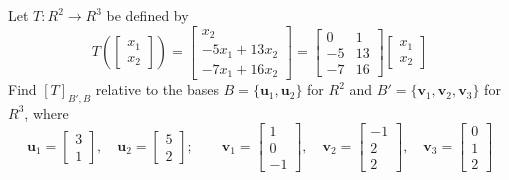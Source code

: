 \documentclass{article}
\begin{document}
Let $T : R^2 \to R^3$ be defined by
\[
  T\!\left(\begin{bmatrix}x_1\\x_2\end{bmatrix}\right)
  = \begin{bmatrix}x_2\\-5x_1+13x_2\\-7x_1+16x_2\end{bmatrix}
  = \begin{bmatrix}0&1\\-5&13\\-7&16\end{bmatrix}\begin{bmatrix}x_1\\x_2\end{bmatrix}
\]
Find $[T]_{B',B}$ relative to the bases $B = \{\mathbf{u}_1, \mathbf{u}_2\}$ for $R^2$
and $B' = \{\mathbf{v}_1, \mathbf{v}_2, \mathbf{v}_3\}$ for $R^3$, where
\[
  \mathbf{u}_1 = \begin{bmatrix}3\\1\end{bmatrix},\quad
  \mathbf{u}_2 = \begin{bmatrix}5\\2\end{bmatrix};\qquad
  \mathbf{v}_1 = \begin{bmatrix}1\\0\\-1\end{bmatrix},\quad
  \mathbf{v}_2 = \begin{bmatrix}-1\\2\\2\end{bmatrix},\quad
  \mathbf{v}_3 = \begin{bmatrix}0\\1\\2\end{bmatrix}
\]
\end{document}
